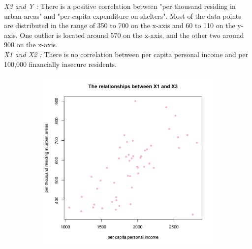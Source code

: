 \documentclass[12pt,letterpaper]{article}
\begin{document}
\begin{itemize}
\emph{X3 and Y :} There is a positive correlation between "per thousand residing in urban areas" and "per capita expenditure on shelters". Most of the data points are distributed in the range of 350 to 700 on the x-axis and 60 to 110 on the y-axis. One outlier is located around 570 on the x-axis, and the other two around 900 on the x-axis.\\
\emph{X1 and X2 :} There is no correlation between per capita personal income and per 100,000 financially insecure residents.


\begin{figure}[h!]
	\centering
	\begin{subfigure}[b]{0.45\textwidth}
		\includegraphics[width=\textwidth]{PS01_Q2_scplot5.png}
		\label{fig:image1}
	\end{subfigure}
	\hspace{.5cm} 
	\begin{subfigure}[b]{0.45\textwidth}

\end{subfigure}
\end{figure}
\end{itemize}
\end{document}
